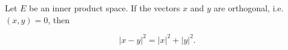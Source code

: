Let $E$ be an inner product space. If the vectors $x$ and $y$ are orthogonal, i.e. $(x, y) = 0$, then

$$|x - y|^2 = |x|^2 + |y|^2.$$
